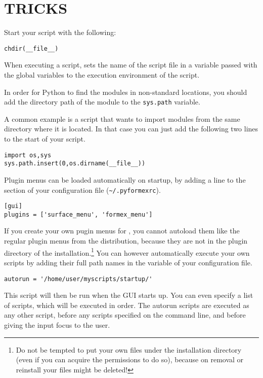 \section{TRICKS}
\label{sec:tricks}

\begin{enumerate}
Start your script with the following:
\begin{verbatim}
chdir(__file__)
\end{verbatim}
When executing a script, \pyf sets the name of the script file in a variable  passed with the global variables to the execution environment of the script.


In order for Python to find the modules in non-standard locations, you should add the directory path of the module to the \verb|sys.path| variable. 

A common example is a script that wants to import modules from the same directory where it is located. In that case you can just add the following two lines to the start of your script.
\begin{verbatim}
import os,sys
sys.path.insert(0,os.dirname(__file__))
\end{verbatim}

Plugin menus can be loaded automatically on \pyformex startup, by adding a line to the  section of your configuration file (\verb|~/.pyformexrc|).
\begin{verbatim}
[gui]
plugins = ['surface_menu', 'formex_menu']
\end{verbatim}

If you create your own pugin menus for \pyformex, you cannot autoload them like the regular plugin menus from the distribution, because they are not in the plugin directory of the installation.\footnote{Do not be tempted to put your own files under the installation directory (even if you can acquire the permissions to do so), because on removal or reinstall your files might be deleted!}
You can however automatically execute your own scripts by adding their full path names in the  variable of your configuration file.
\begin{verbatim}
autorun = '/home/user/myscripts/startup/'
\end{verbatim}
This script will then be run when the \pyformex GUI starts up. You can even specify a list of scripts, which will be executed in order.
The autorun scripts are executed as any other \pyformex script, before any scripts specified on the command line, and before giving the input focus to the user.


\end{enumerate}
